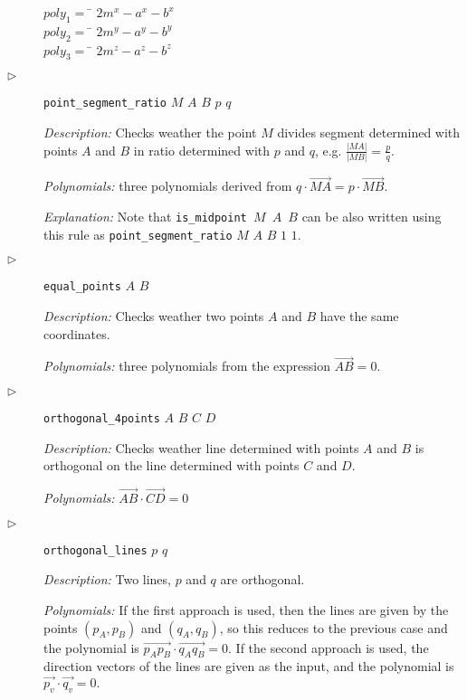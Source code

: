\documentclass{aicom2e}
\begin{document}
\begin{description}
\begin{tabbing}
$poly_1 = $ \= $2m^x - a^x - b^x$ \\ 
$poly_2 = $ \= $2m^y - a^y - b^y$ \\ 
$poly_3 = $ \= $2m^z - a^z - b^z$
\end{tabbing}

\item[$\triangleright$] {\tt point\_segment\_ratio} $M$ $A$ $B$ $p$ $q$

{\em Description:} Checks weather the point $M$ divides segment
determined with points $A$ and $B$ in ratio determined with $p$ and
$q$, e.g. $\frac{|MA|}{|MB|} = \frac{p}{q}$.

{\em Polynomials:} three polynomials derived from
$q\cdot \overrightarrow{MA} = p\cdot \overrightarrow{MB}$.

{\em Explanation:} Note that {\tt is\_midpoint $M$ $A$ $B$} can be
also written using this rule as {\tt point\_segment\_ratio} $M$ $A$
$B$ $1$ $1$.

\item[$\triangleright$] {\tt equal\_points} $A$ $B$

{\em Description:} Checks weather two points $A$ and $B$ have the same
coordinates.

{\em Polynomials:} three polynomials from the expression
$\overrightarrow{AB} = 0$.

\item[$\triangleright$] {\tt orthogonal\_4points} $A$ $B$ $C$ $D$

{\em Description:} Checks weather line determined with points $A$
and $B$ is orthogonal on the line determined with points $C$ and
$D$.

{\em Polynomials:} $\overrightarrow{AB} \cdot \overrightarrow{CD} = 0$

\item[$\triangleright$] {\tt orthogonal\_lines} $p$ $q$

{\em Description:} Two lines, $p$ and $q$ are orthogonal.

{\em Polynomials:} If the first approach is used, then the lines are
given by the points $(p_A, p_B)$ and $(q_A, q_B)$, so this reduces to
the previous case and the polynomial is
$\overrightarrow{p_Ap_B} \cdot \overrightarrow{q_Aq_B} = 0$. If the
second approach is used, the direction vectors of the lines are given
as the input, and the polynomial is
$\overrightarrow{p_v} \cdot \overrightarrow{q_v} = 0.$


\end{description}
\end{document}
